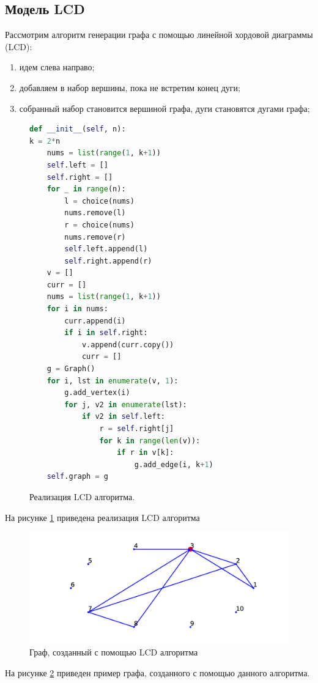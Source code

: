 \subsection{Модель LCD}
Рассмотрим алгоритм генерации графа с помощью линейной хордовой
диаграммы (LCD):
\begin{enumerate}
    \item идем слева направо;
    \item добавляем в набор вершины, пока не встретим конец дуги;
    \item собранный набор становится вершиной графа, дуги становятся дугами графа;
\end{enumerate}
\begin{figure}[H] 
\begin{lstlisting}[language=Python] 
def __init__(self, n):
k = 2*n
    nums = list(range(1, k+1))
    self.left = []
    self.right = []
    for _ in range(n):
        l = choice(nums)
        nums.remove(l)
        r = choice(nums)
        nums.remove(r)
        self.left.append(l)
        self.right.append(r)
    v = []
    curr = []
    nums = list(range(1, k+1))
    for i in nums:
        curr.append(i)
        if i in self.right:
            v.append(curr.copy())
            curr = []
    g = Graph()
    for i, lst in enumerate(v, 1):
        g.add_vertex(i)
        for j, v2 in enumerate(lst):
            if v2 in self.left:
                r = self.right[j]
                for k in range(len(v)):
                    if r in v[k]:
                        g.add_edge(i, k+1)
    self.graph = g
\end{lstlisting}  
    \caption{Реализация LCD алгоритма.}
    \label{lcd1}
\end{figure} 
На рисунке \ref{lcd1} приведена реализация 
LCD алгоритма
\begin{figure}[H] 
    \includegraphics{lcd.pdf} 
    \caption{Граф, созданный с помощью LCD алгоритма}
    \label{lcd2}
\end{figure} 
На рисунке \ref{lcd2} приведен пример графа, созданного с помощью 
данного алгоритма.

